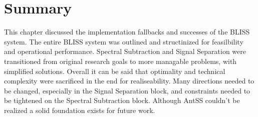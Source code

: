\section{Summary}

This chapter discussed the implementation fallbacks and successes of the BLISS system.  The entire BLISS system was outlined and structinized for feasilbility and operational performance.  Spectral Subtraction and Signal Separation were transitioned from original research goals to more managable problems, with simplified solutions.  Overall it can be said that optimality and technical complexity were sacrificed in the end for realiseability.  Many directions needed to be changed, especially in the Signal Separation block, and constraints needed to be tightened on the Spectral Subtraction block.  Although AntSS couldn't be realized a solid foundation exists for future work.\\ 




